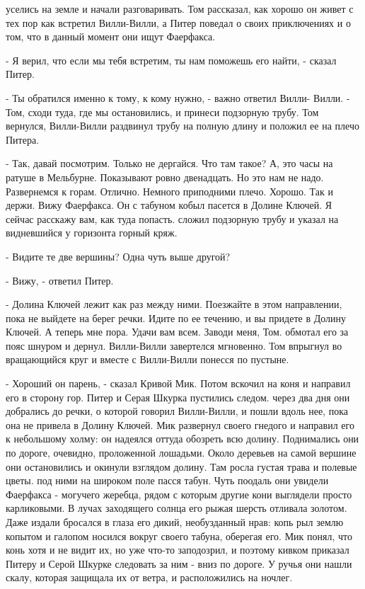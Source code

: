  уселись на земле и начали разговаривать. Том рассказал, как 
хорошо он живет с тех пор как встретил Вилли-Вилли, а Питер поведал о 
своих приключениях и о том, что в данный момент они ищут Фаерфакса.
\par- Я верил, что если мы тебя встретим, ты нам поможешь его найти, - 
сказал Питер.
\par- Ты обратился именно к тому, к кому нужно, - важно ответил Вилли-
Вилли. - Том, сходи туда, где мы остановились, и принеси подзорную 
трубу.
 Том вернулся, Вилли-Вилли раздвинул трубу на полную длину и 
положил ее на плечо Питера.
\par- Так, давай посмотрим. Только не дергайся. Что там такое? А, это 
часы на ратуше в Мельбурне. Показывают ровно двенадцать. Но это нам не 
надо. Развернемся к горам. Отлично. Немного приподними плечо. Хорошо. 
Так и держи. Вижу Фаерфакса. Он с табуном кобыл пасется в Долине 
Ключей. Я сейчас расскажу вам, как туда попасть.
 сложил подзорную трубу и указал на видневшийся у горизонта 
горный кряж.
\par- Видите те две вершины? Одна чуть выше другой?
\par- Вижу, - ответил Питер.
\par- Долина Ключей лежит как раз между ними. Поезжайте в этом 
направлении, пока не выйдете на берег речки. Идите по ее течению, и вы 
придете в Долину Ключей. А теперь мне пора. Удачи вам всем. Заводи 
меня, Том.
 обмотал его за пояс шнуром и дернул. Вилли-Вилли завертелся 
мгновенно. Том впрыгнул во вращающийся круг и вместе с Вилли-Вилли 
понесся по пустыне.
\par- Хороший он парень, - сказал Кривой Мик. Потом вскочил на коня и 
направил его в сторону гор. Питер и Серая Шкурка пустились следом.
 через два дня они добрались до речки, о которой говорил 
Вилли-Вилли, и пошли вдоль нее, пока она не привела в Долину Ключей.
 Мик развернул своего гнедого и направил его к небольшому 
холму: он надеялся оттуда обозреть всю долину. Поднимались они по 
дороге, очевидно, проложенной лошадьми. Около деревьев на самой 
вершине они остановились и окинули взглядом долину. Там росла густая 
трава и полевые цветы.
 под ними на широком поле пасся табун. Чуть поодаль они 
увидели Фаерфакса - могучего жеребца, рядом с которым другие кони 
выглядели просто карликовыми. В лучах заходящего солнца его рыжая 
шерсть отливала золотом. Даже издали бросался в глаза его дикий, 
необузданный нрав: копь рыл землю копытом и галопом носился вокруг 
своего табуна, оберегая его.
 Мик понял, что конь хотя и не видит их, но уже что-то 
заподозрил, и поэтому кивком приказал Питеру и Серой Шкурке следовать 
за ним - вниз по дороге. У ручья они нашли скалу, которая защищала их 
от ветра, и расположились на ночлег.
